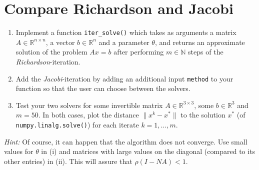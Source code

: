 \section{Compare Richardson and Jacobi}
\vspace{-0.5cm}
	\begin{enumerate}
		\item 	Implement a function \verb|iter_solve()| which takes as arguments a matrix $A \in \mathbb{R}^{n \times n}$, a vector $b \in \mathbb{R}^ {n}$ and a parameter $\theta$,
		and returns an approximate solution of the problem $Ax = b$ after performing $m \in \mathbb{N}$ steps of the \textit{Richardson}-iteration.
		\item Add the \textit{Jacobi}-iteration by adding an additional input \verb|method| to your function so that the user can choose between the solvers.
		\item Test your two solvers for some invertible matrix $A\in \mathbb{R}^{3 \times 3}$, some $b\in \mathbb{R}^3$ and $m = 50$. In both cases, plot the distance $\| x^k - x^*\|$ to the solution $x^*$ (of \verb|numpy.linalg.solve()|) for each iterate $k=1,\dots,m$.
	\end{enumerate}
	\textit{Hint: } Of course, it can happen that the algorithm does not converge. Use small values for $\theta$ in (i) and matrices with large values
	on the diagonal (compared to its other entries) in (ii). This will assure that $\rho(I-NA)<1$. 